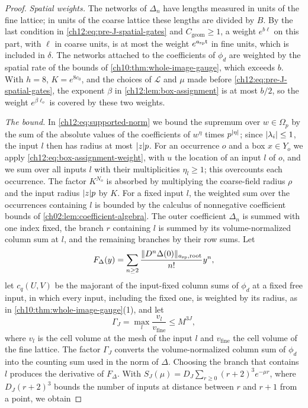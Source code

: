 \begin{proof}
\emph{Spatial weights.} The networks of $\Delta_n$ have lengths measured in units of the fine lattice; in units of the coarse lattice these lengths are divided by $B$. By the last condition in \eqref{ch12:eq:pre-J-spatial-gates} and $C_{\mathrm{geom}}\ge1$, a weight $e^{b\ell}$ on this part, with $\ell$ in coarse units, is at most the weight $e^{a_{\mathrm{sp}}\mathsf t}$ in fine units, which is included in $\delta$. The networks attached to the coefficients of $\phi_d$ are weighted by the spatial rate of the bounds of \cref{ch10:thm:whole-image-gauge}, which exceeds $b$. With $h=8$, $K=e^{8c_0}$, and the choices of $\mathscr L$ and $\mu$ made before \eqref{ch12:eq:pre-J-spatial-gates}, the exponent $\beta$ in \cref{ch12:lem:box-assignment} is at most $b/2$, so the weight $e^{\beta\ell_o}$ is covered by these two weights.

\emph{The bound.} In \eqref{ch12:eq:supported-norm} we bound the supremum over $w\in\Omega_p$ by the sum of the absolute values of the coefficients of $w^\eta$ times $p^{\lvert \eta\rvert}$; since $\lvert \lambda_i\rvert\le1$, the input $l$ then has radius at most $\lvert z\rvert p$. For an occurrence $o$ and a box $x\in Y_o$ we apply \eqref{ch12:eq:box-assignment-weight}, with $u$ the location of an input $l$ of $o$, and we sum over all inputs $l$ with their multiplicities $\eta_l\ge1$; this overcounts each occurrence. The factor $K^{N_o}$ is absorbed by multiplying the coarse-field radius $\rho$ and the input radius $\lvert z\rvert p$ by $K$. For a fixed input $l$, the weighted sum over the occurrences containing $l$ is bounded by the calculus of nonnegative coefficient bounds of \cref{ch02:lem:coefficient-algebra}. The outer coefficient $\Delta_n$ is summed with one index fixed, the branch $r$ containing $l$ is summed by its volume-normalized column sum at $l$, and the remaining branches by their row sums. Let
\[
 F_\Delta(y)=\sum_{n\ge2}\frac{\lVert D^n\Delta(0)\rVert_{a_{\mathrm{sp}},\mathrm{root}}}{n!}y^n,
\]
let $c_q(U,V)$ be the majorant of the input-fixed column sums of $\phi_d$ at a fixed free input, in which every input, including the fixed one, is weighted by its radius, as in \cref{ch10:thm:whole-image-gauge}(1), and let
\[
 \Gamma_J=\max_l\frac{v_l}{v_{\mathrm{fine}}}\le M^{3J},
\]
where $v_l$ is the cell volume at the mesh of the input $l$ and $v_{\mathrm{fine}}$ the cell volume of the fine lattice. The factor $\Gamma_J$ converts the volume-normalized column sum of $\phi_d$ into the counting sum used in the norm of $\Delta$. Choosing the branch that contains $l$ produces the derivative of $F_\Delta$. With $S_J(\mu)=D_J\sum_{r\ge0}(r+2)^3e^{-\mu r}$, where $D_J(r+2)^3$ bounds the number of inputs at distance between $r$ and $r+1$ from a point, we obtain

\end{proof}
